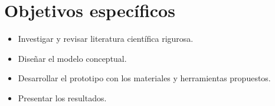 \section{Objetivos específicos}
\begin{itemize}
  \item Investigar y revisar literatura científica rigurosa.
  \item Diseñar el modelo conceptual.
  \item Desarrollar el prototipo con los materiales y herramientas propuestos.
  \item Presentar los resultados.
\end{itemize}